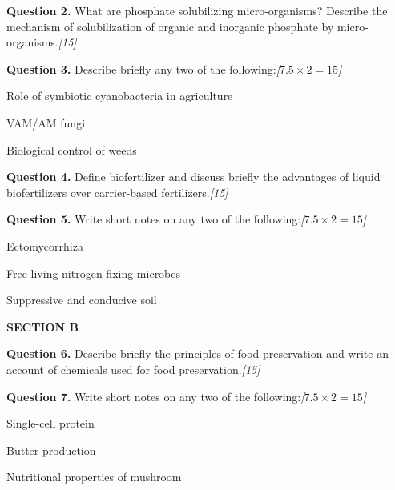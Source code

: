 \documentclass[11pt,a4paper]{article}
\newcommand{\pts}[1]{\hfill   \textit{[#1]}}
\begin{document}
\noindent   \textbf{Question 2.} What are phosphate solubilizing micro-organisms? Describe the mechanism of solubilization of organic and inorganic phosphate by micro-organisms.\pts{15}

\medskip


\noindent   \textbf{Question 3.} Describe briefly any two of the following:\pts{$7.5  \times 2 = 15$}

\begin{parts}
  \item Role of symbiotic cyanobacteria in agriculture
  \item VAM/AM fungi
  \item Biological control of weeds
\end{parts}

\medskip


\noindent   \textbf{Question 4.} Define biofertilizer and discuss briefly the advantages of liquid biofertilizers over carrier-based fertilizers.\pts{15}

\medskip


\noindent   \textbf{Question 5.} Write short notes on any two of the following:\pts{$7.5  \times 2 = 15$}

\begin{parts}
  \item Ectomycorrhiza
  \item Free-living nitrogen-fixing microbes
  \item Suppressive and conducive soil
\end{parts}

\bigskip

\begin{center}
   \textbf{SECTION B}
\end{center}
\medskip

\medskip


\noindent   \textbf{Question 6.} Describe briefly the principles of food preservation and write an account of chemicals used for food preservation.\pts{15}

\medskip


\noindent   \textbf{Question 7.} Write short notes on any two of the following:\pts{$7.5  \times 2 = 15$}

\begin{parts}
  \item Single-cell protein
  \item Butter production
  \item Nutritional properties of mushroom
\end{parts}
\end{document}
